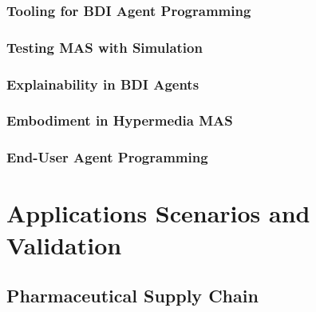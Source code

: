 \documentclass[12pt,a4paper,openright,twoside]{book}
\begin{document}
\section{Tooling for \acs{BDI} Agent Programming}

\section{Testing \acs{MAS} with Simulation}

\section{Explainability in \acs{BDI} Agents}

\section{Embodiment in Hypermedia \acs{MAS}}

\section{End-User Agent Programming}



\part{Applications Scenarios and Validation}

\chapter{Pharmaceutical Supply Chain}
\label{chap:pharmaceutical-supply-chain}
\end{document}
